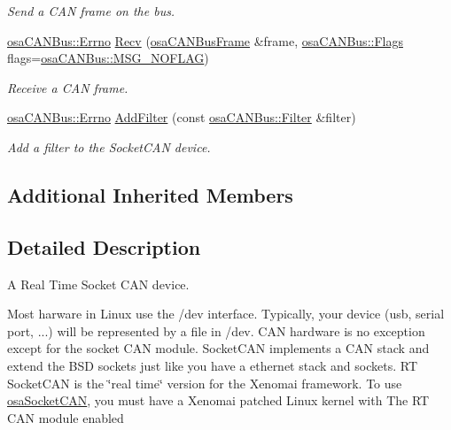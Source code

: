 \begin{DoxyCompactItemize}
\begin{DoxyCompactList}\small\item\em Send a C\-A\-N frame on the bus. \end{DoxyCompactList}\item 
\hyperlink{classosa_c_a_n_bus_a6fa3e95ec4c36932d0640e40e0748fde}{osa\-C\-A\-N\-Bus\-::\-Errno} \hyperlink{classosa_socket_c_a_n_a919c1f68caffb33ddcca41797553be58}{Recv} (\hyperlink{classosa_c_a_n_bus_frame}{osa\-C\-A\-N\-Bus\-Frame} \&frame, \hyperlink{classosa_c_a_n_bus_a74fe35c6059237887431f3ccece7b21b}{osa\-C\-A\-N\-Bus\-::\-Flags} flags=\hyperlink{classosa_c_a_n_bus_a74fe35c6059237887431f3ccece7b21ba30f701fa6e0dba6e274540941ccd3978}{osa\-C\-A\-N\-Bus\-::\-M\-S\-G\-\_\-\-N\-O\-F\-L\-A\-G})
\begin{DoxyCompactList}\small\item\em Receive a C\-A\-N frame. \end{DoxyCompactList}\item 
\hyperlink{classosa_c_a_n_bus_a6fa3e95ec4c36932d0640e40e0748fde}{osa\-C\-A\-N\-Bus\-::\-Errno} \hyperlink{classosa_socket_c_a_n_a139052b40505443b7c82e9983b873508}{Add\-Filter} (const \hyperlink{classosa_c_a_n_bus_1_1_filter}{osa\-C\-A\-N\-Bus\-::\-Filter} \&filter)
\begin{DoxyCompactList}\small\item\em Add a filter to the Socket\-C\-A\-N device. \end{DoxyCompactList}\end{DoxyCompactItemize}
\subsection*{Additional Inherited Members}


\subsection{Detailed Description}
A Real Time Socket C\-A\-N device. 

Most harware in Linux use the /dev interface. Typically, your device (usb, serial port, ...) will be represented by a file in /dev. C\-A\-N hardware is no exception except for the socket C\-A\-N module. Socket\-C\-A\-N implements a C\-A\-N stack and extend the B\-S\-D sockets just like you have a ethernet stack and sockets. R\-T Socket\-C\-A\-N is the \char`\"{}real time\char`\"{} version for the Xenomai framework. To use \hyperlink{classosa_socket_c_a_n}{osa\-Socket\-C\-A\-N}, you must have a Xenomai patched Linux kernel with The R\-T C\-A\-N module enabled 

